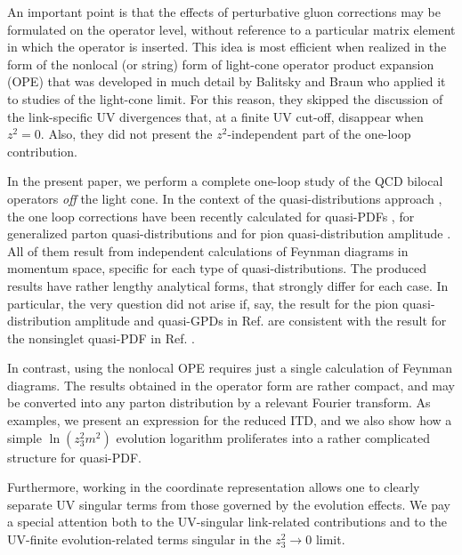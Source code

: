 \documentclass[final,5p,times,twocolumn]{elsarticle}
\begin{document}
An important point is that the effects of perturbative 
gluon corrections may be formulated on   the operator level,
without  reference to a particular matrix element in which 
the operator is inserted. 
 This idea
   is most efficient when realized in the form of the nonlocal (or string) form of %
   light-cone operator product expansion  (OPE)  %
   \cite{Anikin:1978tj}  %
that was developed %
 in much detail 
by Balitsky and Braun \cite{Balitsky:1987bk} who applied it 
to studies of the light-cone limit. For this reason, they skipped 
the discussion of the link-specific UV divergences that,
at a finite UV cut-off, %
 disappear when $z^2=0$. 
 Also, they did  not present  the $z^2$-independent part of the one-loop contribution. %


In the present paper, we perform a 
complete
one-loop study of the QCD bilocal 
operators {\it off}  the light cone. 
In  the context of the quasi-distributions   approach \cite{Ji:2013dva},  %
the one loop corrections have been recently calculated %
for quasi-PDFs  \cite{Xiong:2013bka,Ji:2015jwa},   %
for generalized parton quasi-distributions    %
and for pion quasi-distribution amplitude  %
\cite{Ji:2015qla}.  %
All of them result from     independent calculations of  %
 Feynman diagrams in momentum space,   %
 specific for each  type of  quasi-distributions.   %
  The produced results have rather lengthy analytical forms, that   strongly %
  differ  for each  case. In particular,  the very question did not arise %
if, say, the result for the pion quasi-distribution amplitude  and quasi-GPDs  in Ref. \cite{Ji:2015qla}  %
are  consistent with  the result for the nonsinglet quasi-PDF in Ref.  \cite{Xiong:2013bka,Ji:2015jwa}. %

In   contrast,  using the nonlocal OPE  requires just a single %
calculation of Feynman diagrams. The results obtained  in  the operator form  %
are rather compact, and may be converted into any parton distribution %
by a relevant Fourier transform.  %
As examples, we present an expression  for the reduced ITD,   %
and we also show how a simple $\ln (z_3^2 m^2)$ evolution  logarithm %
proliferates into a rather complicated structure for quasi-PDF. %

Furthermore, working in  the coordinate representation allows one %
to clearly separate UV singular terms  from those governed by the %
evolution effects.  %
We pay 
a special %
attention both to the 
UV-singular link-related contributions 
and to the UV-finite evolution-related  terms singular in the $z_3^2 \to 0$ limit. 
\end{document}
